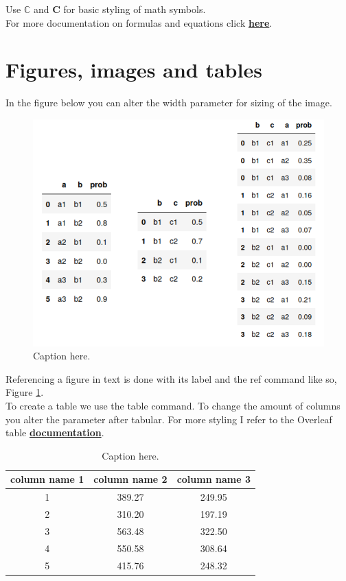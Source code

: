 \documentclass{article}
\begin{document}
Use $\mathbb{C}$ and $\bm{C}$ for basic styling of math symbols.\\

For more documentation on formulas and equations click \href{https://www.overleaf.com/learn/latex/Aligning_equations_with_amsmath}{\bf{here}}.

\section{Figures, images and tables}
In the figure below you can alter the width parameter for sizing of the image.
\begin{figure}[H]
    \centering
    \includegraphics[width=.4\textwidth]{img/table.png}
    \caption{Caption here.}
    \label{fig:exampleFig}
\end{figure}

Referencing a figure in text is done with its label and the ref command like so, Figure \ref{fig:exampleFig}.\\

To create a table we use the table command. To change the amount of columns you alter the parameter after tabular. For more styling I refer to the Overleaf table \href{https://www.overleaf.com/learn/latex/Tables}{\bf{documentation}}.
\begin{table}[H]
    \centering
    \begin{tabular}{c  c  c}
        column name 1 & column name 2 & column name 3 \\ [0.5ex]
        \hline\hline
        1 & 389.27 & 249.95 \\ [1ex]
        
        2 & 310.20 & 197.19 \\ [1ex] 
        
        3 & 563.48 & 322.50 \\ [1ex] 
        
        4 & 550.58 & 308.64 \\ [1ex] 
        
        5 & 415.76 & 248.32 \\ [1ex] 
        \hline
    \end{tabular}
    \caption{Caption here.}
    \label{table:errorsTable}
\end{table}
\end{document}
